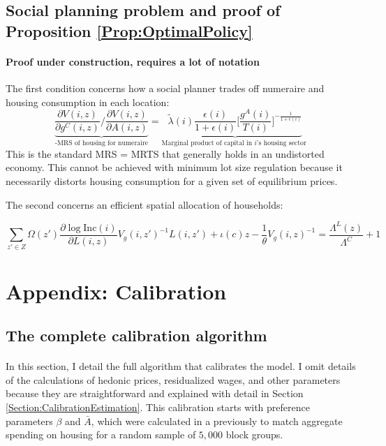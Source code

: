 \documentclass[12pt]{article}
\begin{document}
	
	
	\clearpage
	
	\subsection{Social planning problem and proof of Proposition \ref{Prop:OptimalPolicy}}\label{Appendix:SocialPlanningModel}
	
	\paragraph*{Proof under construction, requires a lot of notation}
	
	The first condition concerns how a social planner trades off numeraire and housing consumption in each location:
	\begin{equation}
		\underbrace{\frac{\partial V(i, z)}{\partial g^{C}(i, z)}/\frac{\partial V(i, z)}{\partial A(i, z)}}_{\text{-MRS of housing for numeraire}} = 	\underbrace{ \tilde{\lambda}(i)\frac{\epsilon(i)}{1 + \epsilon(i)} \bigg[\frac{g^{A}(i)}{T(i)} \bigg]^{-\frac{1}{1 + \epsilon(i)}}}_{\text{Marginal product of capital in $i$'s housing sector }}
	\end{equation}
	This is the standard MRS = MRTS that generally holds in an undistorted economy. This cannot be achieved with minimum lot size regulation because it necessarily distorts housing consumption for a given set of equilibrium prices. 
	
	The second concerns an efficient spatial allocation of households:
	
	\begin{equation}
		\sum_{z' \in Z}\Omega(z')\frac{\partial \log \text{Inc}(i)}{\partial L(i, z)}V_{g}(i, z')^{-1}L(i, z') + \iota(c)z- \frac{1}{\theta}V_{g}(i, z)^{-1}= \frac{\Lambda^{L}(z) }{\Lambda^{C}} + 1
	\end{equation}
	
	
	\clearpage
	
	
	\section{Appendix: Calibration}\label{Appendix:Calibration}	
	
	\subsection{The complete calibration algorithm}
	\paragraph*{}
	In this section, I detail the full algorithm that calibrates the model. I omit details of the calculations of hedonic prices, residualized wages, and other parameters because they are straightforward and explained with detail in Section \ref{Section:CalibrationEstimation}. This calibration starts with preference parameters $\beta$ and $\bar{A}$, which were calculated in a previously to match aggregate spending on housing for a random sample of $5,000$ block groups.  
	
\end{document}

